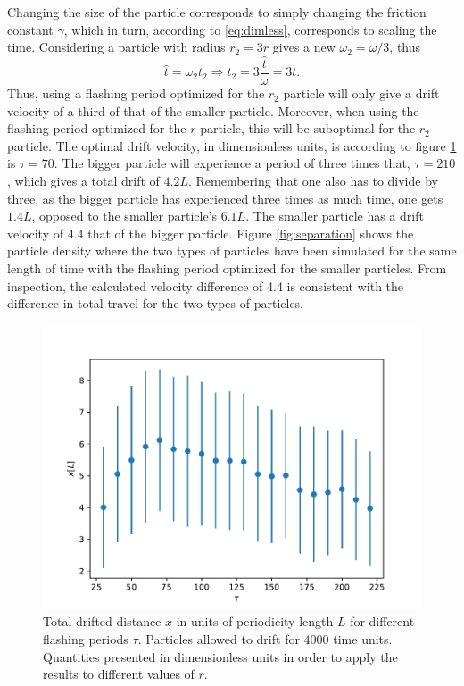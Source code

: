 \documentclass[a4paper, 12pt]{article}
\begin{document}
Changing the size of the particle corresponds to simply changing the friction constant $\gamma$, which in turn, according to \eqref{eq:dimless}, corresponds to scaling the time.
Considering a particle with radius $r_2 = 3r$ gives a new $\omega_2 = \omega/3$, thus
$$
\hat{t} = \omega_2 t_2 \Rightarrow t_2 = 3\frac{\hat{t}}{\omega} = 3t.
$$
Thus, using a flashing period optimized for the $r_2$ particle will only give a drift velocity of a third of that of the smaller particle.
Moreover, when using the flashing period optimized for the $r$ particle, this will be suboptimal for the $r_2$ particle.
The optimal drift velocity, in dimensionless units, is according to figure \ref{fig:drift_vel} is $\tau = 70$.
The bigger particle will experience a period of three times that, $\tau = 210$, which gives a total drift of $4.2L$.
Remembering that one also has to divide by three, as the bigger particle has experienced three times as much time, one gets $1.4L$, opposed to the smaller particle's $6.1L$.
The smaller particle has a drift velocity of 4.4 that of the bigger particle.
Figure \ref{fig:separation} shows the particle density where the two types of particles have been simulated for the same length of time with the flashing period optimized for the smaller particles.
From inspection, the calculated velocity difference of 4.4 is consistent with the difference in total travel for the two types of particles.




\begin{figure}[ht]
\centering
\includegraphics[width=.75\textwidth]{media/drift_dist}
\caption{Total drifted distance $x$ in units of periodicity length $L$ for different flashing periods $\tau$.
Particles allowed to drift for $4000$ time units.
Quantities presented in dimensionless units in order to apply the results to different values of $r$.
\label{fig:drift_vel}}
\end{figure}
\end{document}
